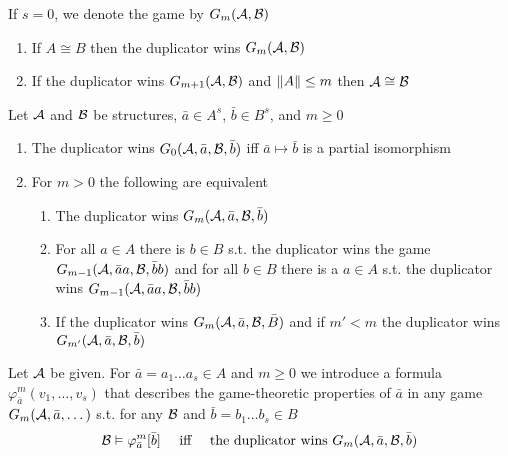 \documentclass[11pt]{article}
\begin{document}
If \(s=0\), we denote the game by \(G_m(\mathcal{A},\mathcal{B})\)

\begin{lemma}[]
\begin{enumerate}
\item If \(A\cong B\) then the duplicator wins \(G_m(\mathcal{A},\mathcal{B})\)
\item If the duplicator wins \(G_{m+1}(\mathcal{A},\mathcal{B})\) and \(\left\lVert A\right\rVert\le m\) then \(\mathcal{A}\cong\mathcal{B}\)
\end{enumerate}
\end{lemma}

\begin{lemma}[]
\label{lemma2.2.4}
Let \(\mathcal{A}\) and \(\mathcal{B}\) be structures, \(\bar{a}\in A^s\), \(\bar{b}\in B^s\), and \(m\ge0\)
\begin{enumerate}
\item The duplicator wins \(G_0(\mathcal{A},\bar{a},\mathcal{B},\bar{b})\) iff \(\bar{a}\mapsto\bar{b}\) is a
partial isomorphism
\item For \(m>0\) the following are equivalent
\begin{enumerate}
\item The duplicator wins \(G_m(\mathcal{A},\bar{a},\mathcal{B},\bar{b})\)
\item For all \(a\in A\) there is \(b\in B\) s.t. the duplicator wins the
game \(G_{m-1}(\mathcal{A},\bar{a}a,\mathcal{B},\bar{b}b)\) and for all \(b\in B\) there is
a \(a\in A\) s.t. the duplicator wins \(G_{m-1}(\mathcal{A},\bar{a}a,\mathcal{B},\bar{b}b)\)
\item If the duplicator wins \(G_m(\mathcal{A},\bar{a},\mathcal{B},\bar{B})\) and if \(m'<m\) the duplicator
wins \(G_{m'}(\mathcal{A},\bar{a},\mathcal{B},\bar{b})\)
\end{enumerate}
\end{enumerate}
\end{lemma}

Let \(\mathcal{A}\) be given. For \(\bar{a}=a_1\dots a_s\in A\) and \(m\ge0\) we introduce a formula
\(\varphi^m_{\bar{a}}(v_1,\dots,v_s)\) that describes the game-theoretic properties
of \(\bar{a}\) in any game \(G_m(\mathcal{A},\bar{a},\dots)\) s.t. for any \(\mathcal{B}\)
and \(\bar{b}=b_1\dots b_s\in B\)
\begin{equation*}
\mathcal{B}\vDash\varphi^m_{\bar{a}}[\bar{b}]
\quad\text{ iff }\quad
\text{the duplicator wins }G_m(\mathcal{A},\bar{a},\mathcal{B},\bar{b})
\end{equation*}
\end{document}
